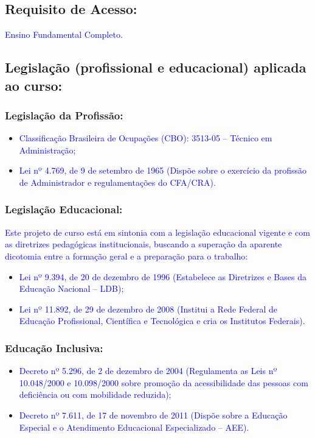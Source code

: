 \documentclass{../../modelos/latex-shared/ifsc-ppc}
\newcommand{\revisao}[1]{\textcolor{blue}{#1}}
\newcommand{\revisao}[1]{#1}
\begin{document}
\subsection{Requisito de Acesso:}
\revisao{Ensino Fundamental Completo.}

\subsection{Legislação (profissional e educacional) aplicada ao curso:}

\subsubsection{Legislação da Profissão:}
\begin{itemize}
    \item \revisao{Classificação Brasileira de Ocupações (CBO): 3513-05 -- Técnico em Administração;}
    \item \revisao{Lei nº 4.769, de 9 de setembro de 1965 (Dispõe sobre o exercício da profissão de Administrador e regulamentações do CFA/CRA).}
\end{itemize}

\subsubsection{Legislação Educacional:}
\revisao{Este projeto de curso está em sintonia com a legislação educacional vigente e com as diretrizes pedagógicas institucionais, buscando a superação da aparente dicotomia entre a formação geral e a preparação para o trabalho:}
\begin{itemize}
    \item \revisao{Lei nº 9.394, de 20 de dezembro de 1996 (Estabelece as Diretrizes e Bases da Educação Nacional -- LDB);}
    \item \revisao{Lei nº 11.892, de 29 de dezembro de 2008 (Institui a Rede Federal de Educação Profissional, Científica e Tecnológica e cria os Institutos Federais).}
\end{itemize}

\subsubsection{Educação Inclusiva:}
\begin{itemize}
    \item \revisao{Decreto nº 5.296, de 2 de dezembro de 2004 (Regulamenta as Leis nº 10.048/2000 e 10.098/2000 sobre promoção da acessibilidade das pessoas com deficiência ou com mobilidade reduzida);}
    \item \revisao{Decreto nº 7.611, de 17 de novembro de 2011 (Dispõe sobre a Educação Especial e o Atendimento Educacional Especializado -- AEE).}
\end{itemize}
\end{document}
